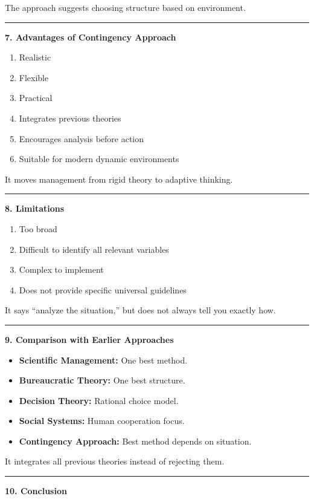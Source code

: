 \documentclass[10pt,a4paper]{article}
\newcommand{\separator}{\vspace{0.4em}\noindent\rule{\linewidth}{0.6pt}\vspace{0.4em}}
\begin{document}
The approach suggests choosing structure based on environment.

\separator

\textbf{7. Advantages of Contingency Approach}

\begin{enumerate}
  \item Realistic
  \item Flexible
  \item Practical
  \item Integrates previous theories
  \item Encourages analysis before action
  \item Suitable for modern dynamic environments
\end{enumerate}

It moves management from rigid theory to adaptive thinking.

\separator

\textbf{8. Limitations}

\begin{enumerate}
  \item Too broad
  \item Difficult to identify all relevant variables
  \item Complex to implement
  \item Does not provide specific universal guidelines
\end{enumerate}

It says ``analyze the situation,'' but does not always tell you exactly how.

\separator

\textbf{9. Comparison with Earlier Approaches}

\begin{itemize}
  \item \textbf{Scientific Management:} One best method.
  \item \textbf{Bureaucratic Theory:} One best structure.
  \item \textbf{Decision Theory:} Rational choice model.
  \item \textbf{Social Systems:} Human cooperation focus.
  \item \textbf{Contingency Approach:} Best method depends on situation.
\end{itemize}

It integrates all previous theories instead of rejecting them.

\separator

\textbf{10. Conclusion}
\end{document}
